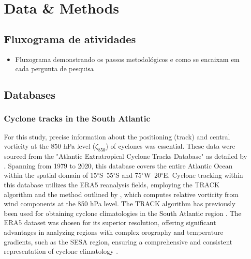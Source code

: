 \chapter{Data \& Methods}\label{metodos}

\section{Fluxograma de atividades}

\begin{itemize}
    \item Fluxograma demonstrando os passos metodológicos e como se encaixam em cada pergunta de pesquisa
\end{itemize}

\section{Databases}

\subsection{Cyclone tracks in the South Atlantic}
\label{track_method}

For this study, precise information about the positioning (track) and central vorticity at the 850 hPa level (\(\zeta_{850}\)) of cyclones was essential. These data were sourced from the "Atlantic Extratropical Cyclone Tracks Database" as detailed by \citet{gramcianinov2020data}. Spanning from 1979 to 2020, this database covers the entire Atlantic Ocean within the spatial domain of 15\(^\circ\)S–55\(^\circ\)S and 75\(^\circ\)W–20\(^\circ\)E. Cyclone tracking within this database utilizes the ERA5 reanalysis fields, employing the TRACK algorithm \citep{hodges1994general, hodges1995feature} and the method outlined by \citet{hoskins2002new}, which computes relative vorticity from wind components at the 850 hPa level. The TRACK algorithm has previously been used for obtaining cyclone climatologies in the South Atlantic region \citep{gramcianinov2019properties,gramcianinov2020analysis}. The ERA5 dataset was chosen for its superior resolution, offering significant advantages in analyzing regions with complex orography and temperature gradients, such as the SESA region, ensuring a comprehensive and consistent representation of cyclone climatology \citep{gramcianinov2020analysis}.

